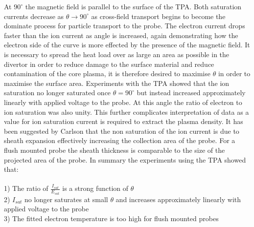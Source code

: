 \documentclass[12pt]{article}
\begin{document}
At $90^{\circ}$ the magnetic field is parallel to the surface of the TPA. Both saturation currents decrease as $\theta \to 90^{\circ}$ as cross-field transport begins to become the dominate process for particle transport to the probe. The electron current drops faster than the ion current as angle is increased, again demonstrating how the electron side of the curve is more effected by the presence of the magnetic field. It is necessary to spread the heat load over as large an area as possible in the divertor in order to reduce damage to the surface material and reduce contamination of the core plasma, it is therefore desired to maximise $\theta$ in order to  maximise the surface area. Experiments with the TPA showed that the ion saturation no longer saturated once $\theta = 90 ^{\circ}$ but instead increased approximately linearly with applied voltage to the probe. At this angle the ratio of electron to ion saturation was also unity. This further complicates interpretation of data as a value for ion saturation current is required to extract the plasma density. It has been suggested by Carlson that the non saturation of the ion current is due to sheath expansion effectively increasing the collection area of the probe. For a flush mounted probe the sheath thickness is comparable to the size of the projected area of the probe. 
In summary the experiments using the TPA
showed that: \\
\\
1) The ratio of $\frac{I_{sat}}{E_{sat}}$ is a  strong function of $\theta$\\
2) $I_{sat}$ no longer saturates at small $\theta$ and
increases approximately linearly with applied voltage to the probe \\
3) The fitted electron temperature is too high for flush mounted probes\\ 
\end{document}
